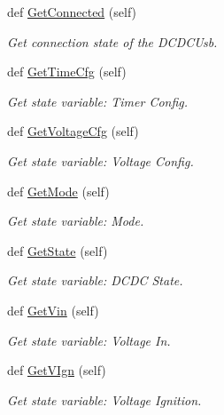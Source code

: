 \begin{DoxyCompactItemize}
def \hyperlink{class_mini_box_d_c_d_c_1_1_dc_dc_converter_1_1_dc_dc_converter_ada9b2c23ab9374a38138078145b33936}{Get\+Connected} (self)
\begin{DoxyCompactList}\small\item\em Get connection state of the D\+C\+D\+C\+Usb. \end{DoxyCompactList}\item 
def \hyperlink{class_mini_box_d_c_d_c_1_1_dc_dc_converter_1_1_dc_dc_converter_a69f84222f6b255a67146257b09928765}{Get\+Time\+Cfg} (self)
\begin{DoxyCompactList}\small\item\em Get state variable\+: Timer Config. \end{DoxyCompactList}\item 
def \hyperlink{class_mini_box_d_c_d_c_1_1_dc_dc_converter_1_1_dc_dc_converter_a66192e46faf63db1c783a2615cb20ad8}{Get\+Voltage\+Cfg} (self)
\begin{DoxyCompactList}\small\item\em Get state variable\+: Voltage Config. \end{DoxyCompactList}\item 
def \hyperlink{class_mini_box_d_c_d_c_1_1_dc_dc_converter_1_1_dc_dc_converter_af3c0f6182a25fb1a15e5cd9558cfa117}{Get\+Mode} (self)
\begin{DoxyCompactList}\small\item\em Get state variable\+: Mode. \end{DoxyCompactList}\item 
def \hyperlink{class_mini_box_d_c_d_c_1_1_dc_dc_converter_1_1_dc_dc_converter_af0e1ad51c5ef630227e81c19010a6411}{Get\+State} (self)
\begin{DoxyCompactList}\small\item\em Get state variable\+: D\+C\+DC State. \end{DoxyCompactList}\item 
def \hyperlink{class_mini_box_d_c_d_c_1_1_dc_dc_converter_1_1_dc_dc_converter_a45d92fe89be1375296ef78e56168c472}{Get\+Vin} (self)
\begin{DoxyCompactList}\small\item\em Get state variable\+: Voltage In. \end{DoxyCompactList}\item 
def \hyperlink{class_mini_box_d_c_d_c_1_1_dc_dc_converter_1_1_dc_dc_converter_aa1bfa57870e6fd2b2ff8ff6bd0461d2c}{Get\+V\+Ign} (self)
\begin{DoxyCompactList}\small\item\em Get state variable\+: Voltage Ignition. \end{DoxyCompactList}\item 

\end{DoxyCompactItemize}
